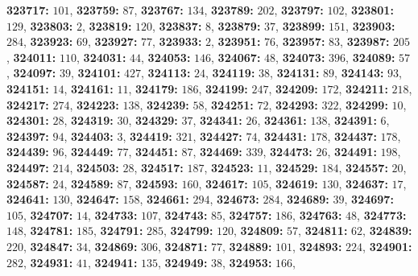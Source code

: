\textsf{\bfseries 323717:} $101$, \textsf{\bfseries 323759:} $87$, \textsf{\bfseries 323767:} $134$, \textsf{\bfseries 323789:} $202$, \textsf{\bfseries 323797:} $102$, \textsf{\bfseries 323801:} $129$, \textsf{\bfseries 323803:} $2$, \textsf{\bfseries 323819:} $120$, \textsf{\bfseries 323837:} $8$, \textsf{\bfseries 323879:} $37$, \textsf{\bfseries 323899:} $151$, \textsf{\bfseries 323903:} $284$, \textsf{\bfseries 323923:} $69$, \textsf{\bfseries 323927:} $77$, \textsf{\bfseries 323933:} $2$, \textsf{\bfseries 323951:} $76$, \textsf{\bfseries 323957:} $83$, \textsf{\bfseries 323987:} $205$, \textsf{\bfseries 324011:} $110$, \textsf{\bfseries 324031:} $44$, \textsf{\bfseries 324053:} $146$, \textsf{\bfseries 324067:} $48$, \textsf{\bfseries 324073:} $396$, \textsf{\bfseries 324089:} $57$, \textsf{\bfseries 324097:} $39$, \textsf{\bfseries 324101:} $427$, \textsf{\bfseries 324113:} $24$, \textsf{\bfseries 324119:} $38$, \textsf{\bfseries 324131:} $89$, \textsf{\bfseries 324143:} $93$, \textsf{\bfseries 324151:} $14$, \textsf{\bfseries 324161:} $11$, \textsf{\bfseries 324179:} $186$, \textsf{\bfseries 324199:} $247$, \textsf{\bfseries 324209:} $172$, \textsf{\bfseries 324211:} $218$, \textsf{\bfseries 324217:} $274$, \textsf{\bfseries 324223:} $138$, \textsf{\bfseries 324239:} $58$, \textsf{\bfseries 324251:} $72$, \textsf{\bfseries 324293:} $322$, \textsf{\bfseries 324299:} $10$, \textsf{\bfseries 324301:} $28$, \textsf{\bfseries 324319:} $30$, \textsf{\bfseries 324329:} $37$, \textsf{\bfseries 324341:} $26$, \textsf{\bfseries 324361:} $138$, \textsf{\bfseries 324391:} $6$, \textsf{\bfseries 324397:} $94$, \textsf{\bfseries 324403:} $3$, \textsf{\bfseries 324419:} $321$, \textsf{\bfseries 324427:} $74$, \textsf{\bfseries 324431:} $178$, \textsf{\bfseries 324437:} $178$, \textsf{\bfseries 324439:} $96$, \textsf{\bfseries 324449:} $77$, \textsf{\bfseries 324451:} $87$, \textsf{\bfseries 324469:} $339$, \textsf{\bfseries 324473:} $26$, \textsf{\bfseries 324491:} $198$, \textsf{\bfseries 324497:} $214$, \textsf{\bfseries 324503:} $28$, \textsf{\bfseries 324517:} $187$, \textsf{\bfseries 324523:} $11$, \textsf{\bfseries 324529:} $184$, \textsf{\bfseries 324557:} $20$, \textsf{\bfseries 324587:} $24$, \textsf{\bfseries 324589:} $87$, \textsf{\bfseries 324593:} $160$, \textsf{\bfseries 324617:} $105$, \textsf{\bfseries 324619:} $130$, \textsf{\bfseries 324637:} $17$, \textsf{\bfseries 324641:} $130$, \textsf{\bfseries 324647:} $158$, \textsf{\bfseries 324661:} $294$, \textsf{\bfseries 324673:} $284$, \textsf{\bfseries 324689:} $39$, \textsf{\bfseries 324697:} $105$, \textsf{\bfseries 324707:} $14$, \textsf{\bfseries 324733:} $107$, \textsf{\bfseries 324743:} $85$, \textsf{\bfseries 324757:} $186$, \textsf{\bfseries 324763:} $48$, \textsf{\bfseries 324773:} $148$, \textsf{\bfseries 324781:} $185$, \textsf{\bfseries 324791:} $285$, \textsf{\bfseries 324799:} $120$, \textsf{\bfseries 324809:} $57$, \textsf{\bfseries 324811:} $62$, \textsf{\bfseries 324839:} $220$, \textsf{\bfseries 324847:} $34$, \textsf{\bfseries 324869:} $306$, \textsf{\bfseries 324871:} $77$, \textsf{\bfseries 324889:} $101$, \textsf{\bfseries 324893:} $224$, \textsf{\bfseries 324901:} $282$, \textsf{\bfseries 324931:} $41$, \textsf{\bfseries 324941:} $135$, \textsf{\bfseries 324949:} $38$, \textsf{\bfseries 324953:} $166$, 
